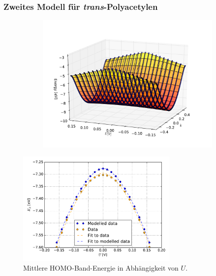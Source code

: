\begin{frame}
\frametitle{Zweites Modell für \emph{trans}-Polyacetylen}
\begin{figure}
\begin{subfigure}{0.3\textwidth}
\centering
{}
\end{subfigure}
\begin{subfigure}{0.68\textwidth}
\centering
\includegraphics[width = \textwidth]{Images/polyacetylene/charging/3D/figure_1-2}
\end{subfigure}
\end{figure}
\end{frame}

\begin{frame}
\begin{figure}
	\centering
	\includegraphics[width = 0.7\textwidth]{Images/polyacetylene/charging/Homo_energy_charge}
	\caption{Mittlere HOMO-Band-Energie in Abhängigkeit von $U$.}
	\label{image_HOMO_average_polyacetylene}
\end{figure}
\end{frame}

